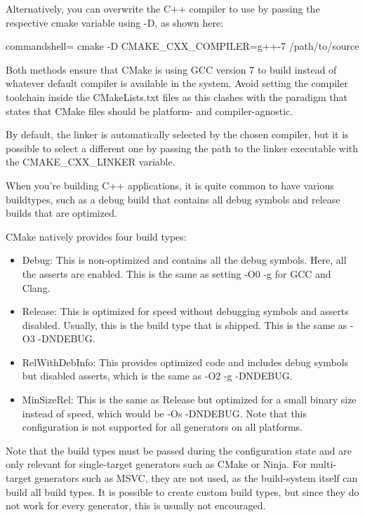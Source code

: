 Alternatively, you can overwrite the C++ compiler to use by passing the respective cmake variable using -D, as shown here:

\begin{tcblisting}{commandshell={}}
cmake -D CMAKE_CXX_COMPILER=g++-7 /path/to/source
\end{tcblisting}

Both methods ensure that CMake is using GCC version 7 to build instead of whatever default compiler is available in the system. Avoid setting the compiler toolchain inside the CMakeLists.txt files as this clashes with the paradigm that states that CMake files should be platform- and compiler-agnostic.

By default, the linker is automatically selected by the chosen compiler, but it is possible to select a different one by passing the path to the linker executable with the CMAKE\_CXX\_LINKER variable.


When you're building C++ applications, it is quite common to have various buildtypes, such as a debug build that contains all debug symbols and release builds that are optimized.

CMake natively provides four build types:

\begin{itemize}
\item 
Debug: This is non-optimized and contains all the debug symbols. Here, all the asserts are enabled. This is the same as setting -O0 -g for GCC and Clang.

\item 
Release: This is optimized for speed without debugging symbols and asserts disabled. Usually, this is the build type that is shipped. This is the same as -O3 -DNDEBUG.

\item 
RelWithDebInfo: This provides optimized code and includes debug symbols but disabled asserts, which is the same as -O2 -g -DNDEBUG.

\item 
MinSizeRel: This is the same as Release but optimized for a small binary size instead of speed, which would be -Os -DNDEBUG. Note that this configuration is not supported for all generators on all platforms.

\end{itemize}

Note that the build types must be passed during the configuration state and are only relevant for single-target generators such as CMake or Ninja. For multi-target generators such as MSVC, they are not used, as the build-system itself can build all build types. It is possible to create custom build types, but since they do not work for every generator, this is usually not encouraged.

